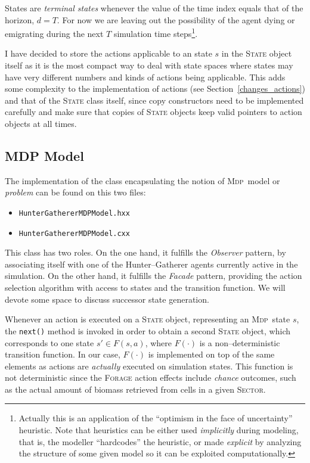 \documentclass[a4paper,10pt]{article}
\newcommand{\mdp}{\textsc{Mdp}}
\begin{document}
States are \emph{terminal states} whenever the value of the time index equals that of the horizon, $d=T$. For now we are
leaving out the possibility of the agent dying or emigrating during the next $T$ simulation time steps\footnote{Actually
this is an application of the ``optimism in the face of uncertainty'' heuristic. Note that heuristics can be either
used \emph{implicitly} during modeling, that is, the modeller ``hardcodes'' the heuristic, or made \emph{explicit} by 
analyzing the structure of some given model so it can be exploited computationally.}.

I have decided to store the actions applicable to an state $s$ in the \textsc{State} object itself as it is the most
compact way to deal with state spaces where states may have very different numbers and kinds of actions being applicable.
This adds some complexity to the implementation of actions (see Section~\ref{changes_actions}) and that of the \textsc{State}
class itself, since copy constructors need to be implemented carefully and make sure that copies of \textsc{State} objects
keep valid pointers to action objects at all times.

\subsection{MDP Model}
\label{mdp_model}
The implementation of the class encapsulating the notion of \mdp~model or \emph{problem} can be found on this
two files:
\begin{itemize}
\item \texttt{HunterGathererMDPModel.hxx}
\item \texttt{HunterGathererMDPModel.cxx}
\end{itemize}

This class has two roles. On the one hand, it fulfills the \emph{Observer} pattern, by associating itself with one
of the Hunter--Gatherer agents currently active in the simulation. On the other hand, it fulfills the \emph{Facade}
pattern, providing the action selection algorithm with access to states and the transition function. We will devote
some space to discuss successor state generation.

Whenever an action is executed on a \textsc{State} object, representing an \mdp~state $s$, the \texttt{next()} method
is invoked in order to obtain a second \textsc{State} object, which corresponds to one state $s' \in F(s,a)$, where
$F(\cdot)$ is a non--deterministic transition function. In our case, $F(\cdot)$ is implemented on top of the same
elements as actions are \emph{actually} executed on simulation states. This function is not deterministic since the
\textsc{Forage} action effects include \emph{chance} outcomes, such as the actual amount of biomass retrieved from
cells in a given \textsc{Sector}.
\end{document}
